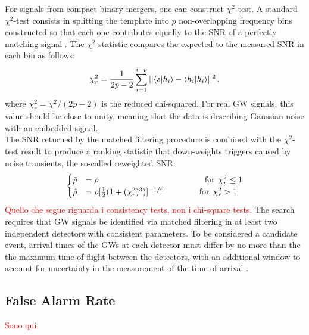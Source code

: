\documentclass[binding=0.6cm, LaM]{sapthesis}
\newcommand{\fpg}[1]{\textcolor{red}{#1} }
\begin{document}
	For signals from compact binary mergers, one can construct $\chi^2$-test.
	A standard $\chi^2$-test consists in splitting the template into $p$ non-overlapping frequency bins 
	constructed so that each one contributes equally to 
	the SNR of a perfectly matching signal \cite{28, 41}. 
	The $\chi^2$ statistic compares the expected to the measured SNR in each bin as follows:
		\begin{equation}
			\chi^2_r = {1 \over {2p-2}}   \sum_{i=1}^{i=p} || \langle   s|h_i  \rangle -   \langle  h_i|h_i   \rangle ||^2\,,
		\end{equation}
	where $\chi^2_r = \chi^2/(2p-2)$ is the reduced chi-squared.  For real GW signals, this value should be close to unity, 
	meaning that the data is describing Gaussian noise with an embedded signal.\\
	The SNR returned by the matched filtering procedure is combined with the $\chi^2$-test result to produce a ranking statistic 
	that down-weights triggers caused by noise transients, the so-called reweighted SNR:
		\begin{equation}
		\begin{cases}
			\hat \rho &= \rho \hspace*{4.5cm}  \text{for} \hspace*{0.15cm}\chi^2_r \leq 1 \\
			\hat \rho &= \rho[{1 \over 2} (1 + (\chi^2_r)^3)]^{-1/6}  \hspace*{1.5cm}  \text{for} \hspace*{0.15cm} \chi^2_r > 1
		\end{cases}
		\end{equation}
                \fpg{Quello che segue riguarda i consistency tests, non i chi-square tests.} 
	The search requires that GW signals be identified via matched filtering 
	in at least two independent detectors with consistent parameters. 
	To be considered a candidate event, arrival times of the GWs at each detector 
	must differ by no more than the the maximum time-of-flight between the detectors, 
	with an additional window to account for uncertainty in the measurement of the time of arrival \cite{13}.
 
\subsection{False Alarm Rate}

\fpg{Sono qui.}
\end{document}
